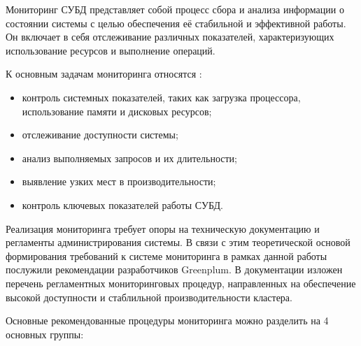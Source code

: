 Мониторинг СУБД представляет собой процесс сбора и анализа информации о состоянии системы с целью обеспечения её стабильной и эффективной работы. Он включает в себя отслеживание различных показателей, характеризующих использование ресурсов и выполнение операций.

К основным задачам мониторинга относятся \cite{monitoringbook}:

\begin{itemize}
	\item контроль системных показателей, таких как загрузка процессора, использование памяти и дисковых ресурсов;
	\item отслеживание доступности системы;
	\item анализ выполняемых запросов и их длительности;
	\item выявление узких мест в производительности;
	\item контроль ключевых показателей работы СУБД.
\end{itemize}

Реализация мониторинга требует опоры на техническую документацию и регламенты администрирования системы. В связи с этим теоретической основой формирования требований к системе мониторинга в рамках данной работы послужили рекомендации разработчиков Greenplum. В документации изложен перечень регламентных мониторинговых процедур, направленных на обеспечение высокой доступности и стаблильной производительности кластера. 

Основные рекомендованные процедуры мониторинга можно разделить на 4 основных группы:

